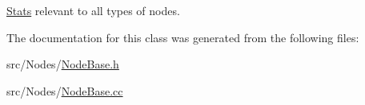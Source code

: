 \hyperlink{class_stats}{Stats} relevant to all types of nodes. 



The documentation for this class was generated from the following files\+:\begin{DoxyCompactItemize}
\item 
src/\+Nodes/\hyperlink{_node_base_8h}{Node\+Base.\+h}\item 
src/\+Nodes/\hyperlink{_node_base_8cc}{Node\+Base.\+cc}\end{DoxyCompactItemize}
